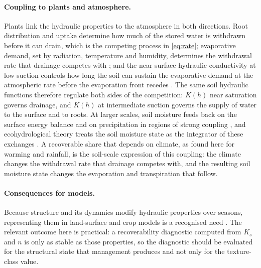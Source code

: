 \paragraph{Coupling to plants and atmosphere.} Plants link the hydraulic properties to the atmosphere in both directions. Root distribution and uptake determine how much of the stored water is withdrawn before it can drain, which is the competing process in \cref{eq:rate}; evaporative demand, set by radiation, temperature and humidity, determines the withdrawal rate that drainage competes with \citep{Roderick2002,Brutsaert1998}; and the near-surface hydraulic conductivity at low suction controls how long the soil can sustain the evaporative demand at the atmospheric rate before the evaporation front recedes \citep{Or2013,Lehmann2008,Shokri2011}. The same soil hydraulic functions therefore regulate both sides of the competition: $K(h)$ near saturation governs drainage, and $K(h)$ at intermediate suction governs the supply of water to the surface and to roots. At larger scales, soil moisture feeds back on the surface energy balance and on precipitation in regions of strong coupling \citep{Entekhabi1996,Koster2004,Seneviratne2010}, and ecohydrological theory treats the soil moisture state as the integrator of these exchanges \citep{Rodriguez2004}. A recoverable share that depends on climate, as found here for warming and rainfall, is the soil-scale expression of this coupling: the climate changes the withdrawal rate that drainage competes with, and the resulting soil moisture state changes the evaporation and transpiration that follow.

\paragraph{Consequences for models.} Because structure and its dynamics modify hydraulic properties over seasons, representing them in land-surface and crop models is a recognised need \citep{Fatichi2020,Vereecken2016,Vereecken2019}. The relevant outcome here is practical: a recoverability diagnostic computed from $K_s$ and $n$ is only as stable as those properties, so the diagnostic should be evaluated for the structural state that management produces and not only for the texture-class value.

